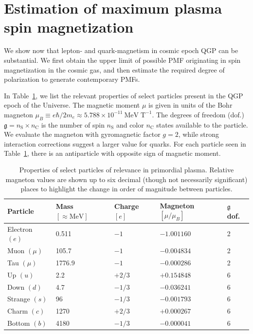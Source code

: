\documentclass[epjST]{svjour}
\begin{document}
{\color{blue}\section{Estimation of maximum plasma spin magnetization}
\label{sec:estimation}
We show now that lepton- and quark-magnetism in cosmic epoch QGP can be substantial. We first obtain the upper limit of possible PMF originating in spin magnetization in the cosmic gas, and then estimate the required degree of polarization to generate contemporary PMFs.} In Table~\ref{tab:particle_properties}, we list the relevant properties of select particles present in the QGP epoch of the Universe. The magnetic moment \(\mu\) is given in units of the Bohr magneton \(\mu_{B}\equiv e\hbar/2m_{e}\approx5.788\times10^{-11}\ \mathrm{MeV\;T}^{-1}\). The degrees of freedom (dof.) \(\mathfrak{g}=n_\mathrm{S}\times n_\mathrm{C}\) is the number of spin \(n_\mathrm{S}\) and color \(n_\mathrm{C}\) states available to the particle. We evaluate the magneton with gyromagnetic factor \(g=2\), while strong interaction corrections suggest a larger value for quarks. For each particle seen in Table~\ref{tab:particle_properties}, there is an antiparticle with opposite sign of magnetic moment. 
\begin{table}%
\centering
\caption{{\color{blue}Properties of select particles of relevance in primordial plasma. Relative magneton values are shown up to six decimal (though not necessarily significant) places to highlight the change in order of magnitude between particles.}}
\label{tab:particle_properties}
\begin{tabular}{@{}lllll@{}}
\toprule
\textbf{Particle} & \textbf{Mass} \([\approx\mathrm{MeV}]\) & \textbf{Charge \([e]\)} & \textbf{Magneton} \([\mu/\mu_{B}]\) & \(\mathfrak{g}\) \textbf{dof.} \\ 
\midrule
Electron \((e)\) & 0.511 & \(-1\) & \(-1.001160\) & 2 \\
Muon \((\mu)\) & 105.7 & \(-1\) & \(-0.004834\) & 2 \\
Tau \((\mu)\) & 1776.9 & \(-1\) & \(-0.000286\) & 2 \\
\midrule
Up \((u)\) & 2.2 & \(+2/3\) & \(+0.154848\) & 6 \\
Down \((d)\) & 4.7 & \(-1/3\) & \(-0.036241\) & 6 \\
Strange \((s)\) & 96 & \(-1/3\) & \(-0.001793\) & 6 \\
Charm \((c)\) & 1270 & \(+2/3\) & \(+0.000267\) & 6 \\
Bottom \((b)\) & 4180 & \(-1/3\) & \(-0.000041\) & 6 \\
\bottomrule
\end{tabular}
\end{table}
\end{document}
